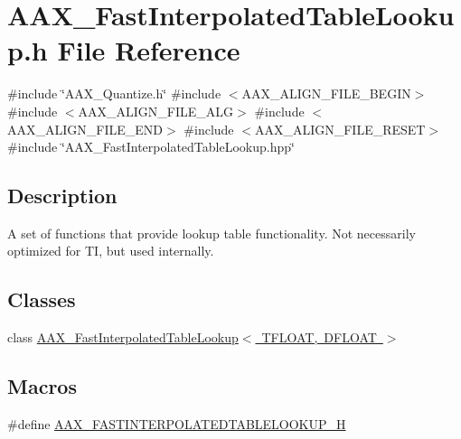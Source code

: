 \hypertarget{a00758}{}\section{A\+A\+X\+\_\+\+Fast\+Interpolated\+Table\+Lookup.\+h File Reference}
\label{a00758}
{\ttfamily \#include \char`\"{}A\+A\+X\+\_\+\+Quantize.\+h\char`\"{}}\newline
{\ttfamily \#include $<$A\+A\+X\+\_\+\+A\+L\+I\+G\+N\+\_\+\+F\+I\+L\+E\+\_\+\+B\+E\+G\+IN$>$}\newline
{\ttfamily \#include $<$A\+A\+X\+\_\+\+A\+L\+I\+G\+N\+\_\+\+F\+I\+L\+E\+\_\+\+A\+LG$>$}\newline
{\ttfamily \#include $<$A\+A\+X\+\_\+\+A\+L\+I\+G\+N\+\_\+\+F\+I\+L\+E\+\_\+\+E\+ND$>$}\newline
{\ttfamily \#include $<$A\+A\+X\+\_\+\+A\+L\+I\+G\+N\+\_\+\+F\+I\+L\+E\+\_\+\+R\+E\+S\+ET$>$}\newline
{\ttfamily \#include \char`\"{}A\+A\+X\+\_\+\+Fast\+Interpolated\+Table\+Lookup.\+hpp\char`\"{}}\newline


\subsection{Description}
A set of functions that provide lookup table functionality. Not necessarily optimized for TI, but used internally. 

\subsection*{Classes}
\begin{DoxyCompactItemize}
\item 
class \mbox{\hyperlink{a01977}{A\+A\+X\+\_\+\+Fast\+Interpolated\+Table\+Lookup$<$ T\+F\+L\+O\+A\+T, D\+F\+L\+O\+A\+T $>$}}
\end{DoxyCompactItemize}
\subsection*{Macros}
\begin{DoxyCompactItemize}
\item 
\#define \mbox{\hyperlink{a00758_aa6d46d2f455a96d76a768d9f9d9b7dda}{A\+A\+X\+\_\+\+F\+A\+S\+T\+I\+N\+T\+E\+R\+P\+O\+L\+A\+T\+E\+D\+T\+A\+B\+L\+E\+L\+O\+O\+K\+U\+P\+\_\+H}}
\end{DoxyCompactItemize}



